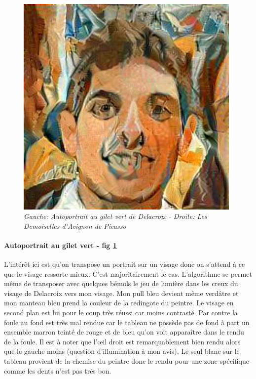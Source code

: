 \documentclass{article}
\begin{document}
\begin{figure}[!htb]
\begin{minipage}{0.25\textwidth}
\end{minipage}%
\begin{minipage}{0.25\textwidth}
\centering
\includegraphics[width=0.98\textwidth]{../Images/transfer/tdf_demoiselles.jpg}
\end{minipage}
\caption{\textit{Gauche: Autoportrait au gilet vert de Delacroix - Droite: Les Demoiselles d'Avignon de Picasso}}
\label{fig:set_2}
\end{figure}

\paragraph*{Autoportrait au gilet vert - fig \ref{fig:set_2}} L'intérêt ici est qu'on transpose un portrait sur un visage donc on s'attend à ce que le visage ressorte mieux. C'est majoritairement le cas. L'algorithme se permet même de transposer avec quelques bémols le jeu de lumière dans les creux du visage de Delacroix vers mon visage. Mon pull bleu devient même verdâtre et mon manteau bleu prend la couleur de la redingote du peintre. Le visage en second plan est lui pour le coup très réussi car moins contrasté. Par contre la foule au fond est très mal rendue car le tableau ne possède pas de fond à part un ensemble marron teinté de rouge et de bleu qu'on voit apparaître dans le rendu de la foule. Il est à noter que l’œil droit est remarquablement bien rendu alors que le gauche moins (question d'illumination à mon avis). Le seul blanc sur le tableau provient de la chemise du peintre donc le rendu pour une zone spécifique comme les dents n'est pas très bon.
\end{document}
